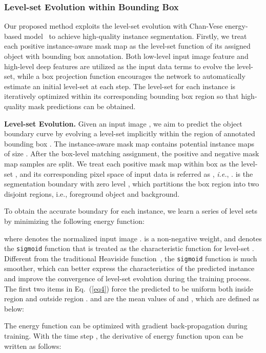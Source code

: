 \documentclass[12pt,onecolumn,letterpaper]{article}
\begin{document}
\subsubsection{Level-set Evolution within Bounding Box}
Our proposed method exploits the level-set evolution with Chan-Vese energy-based model~\cite{tip2001_active_contour} to achieve high-quality instance segmentation.
Firstly, we treat each positive instance-aware mask map as the level-set function  of its assigned object with bounding box annotation. Both low-level input image feature  and high-level deep features  are utilized as the input data terms to evolve the level-set, while a box projection function encourages the network to automatically estimate an initial level-set  at each step. 
The level-set for each instance is iteratively optimized within its corresponding bounding box region so that high-quality mask predictions can be obtained.


\textbf{Level-set Evolution.}  Given an input image , we aim to predict the object boundary curve by evolving a level-set implicitly within the region of annotated bounding box .
The instance-aware mask map   contains  potential instance maps of size .   
After the box-level matching  assignment, the positive and negative mask map samples are split. 
We treat each positive mask map within box  as the level-set , and its corresponding pixel space of input data  is referred as , \textit{i.e.}, .  is the segmentation boundary with zero level , which partitions the box region into two disjoint regions, i.e., foreground object and background. 

To obtain the accurate boundary for each instance, we learn a series of level sets  by minimizing the following energy function:

where  denotes the normalized input image .
 is a non-negative weight, and
 denotes the \texttt{sigmoid} function that is treated as the characteristic function for level-set .  Different from the traditional Heaviside function~\cite{tip2001_active_contour}, the \texttt{sigmoid} function is much smoother, which can better express the characteristics of the predicted instance and improve the convergence of level-set evolution during the training process. The first two items in Eq.~(\ref{eq4}) force the predicted 
to be uniform both inside region  and outside region
.  and  are the mean values of  and , which are defined as below:


The energy function  can be optimized with  gradient back-propagation during training. With the time step , the derivative of energy function  upon  can be written as follows:
\end{document}
